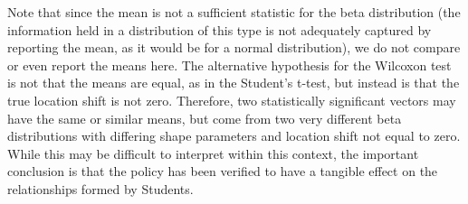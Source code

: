 Note that since the mean is not a sufficient statistic for the beta
distribution (the information held in a distribution of this type is not
adequately captured by reporting the mean, as it would be for a normal
distribution), we do not compare or even report the means here. The
alternative hypothesis for the Wilcoxon test is not that the means are equal,
as in the Student's t-test, but instead is that the true location shift is not
zero. Therefore, two statistically significant vectors may have the same or
similar means, but come from two very different beta distributions with
differing shape parameters and location shift not equal to zero. While this
may be difficult to interpret within this context, the important conclusion is
that the policy has been verified to have a tangible effect on the
relationships formed by Students.







